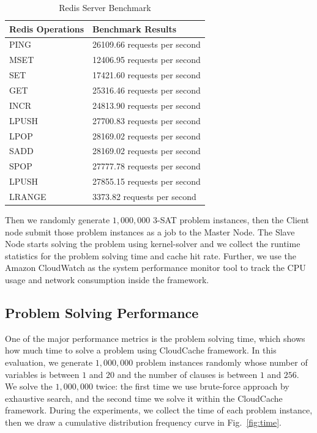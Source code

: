 \begin{table}
\centering
\caption{Redis Server Benchmark}
\begin{tabular}{ll}\toprule
Redis Operations & Benchmark Results \\\midrule
PING & 26109.66 requests per second \\
MSET & 12406.95 requests per second \\
SET & 17421.60 requests per second \\
GET & 25316.46 requests per second \\
INCR & 24813.90 requests per second \\
LPUSH & 27700.83 requests per second \\
LPOP & 28169.02 requests per second \\
SADD & 28169.02 requests per second \\
SPOP & 27777.78 requests per second \\
LPUSH & 27855.15 requests per second \\
LRANGE & 3373.82 requests per second \\\bottomrule
\end{tabular}
\label{tab:redis}
\end{table}

Then we randomly generate $1,000,000$ 3-SAT problem instances, then the Client node submit those problem instances as a job to the Master Node. The Slave Node starts solving the problem using kernel-solver and we collect the runtime statistics for the problem solving time and cache hit rate. Further, we use the Amazon CloudWatch as the system performance monitor tool to track the CPU usage and network consumption inside the framework.

\subsection{Problem Solving Performance}
One of the major performance metrics is the problem solving time, which shows how much time to solve a problem using CloudCache framework. In this evaluation, we generate $1,000,000$ problem instances randomly whose number of variables is between $1$ and $20$ and the number of clauses is between $1$ and $256$. We solve the $1,000,000$ twice: the first time we use brute-force approach by exhaustive search, and the second time we solve it within the CloudCache framework. During the experiments, we collect the time of each problem instance, then we draw a cumulative distribution frequency curve in Fig.~\ref{fig:time}.

